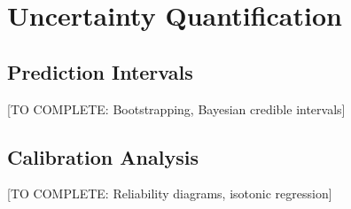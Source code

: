 \section{Uncertainty Quantification}

\subsection{Prediction Intervals}

[TO COMPLETE: Bootstrapping, Bayesian credible intervals]

\subsection{Calibration Analysis}

[TO COMPLETE: Reliability diagrams, isotonic regression]